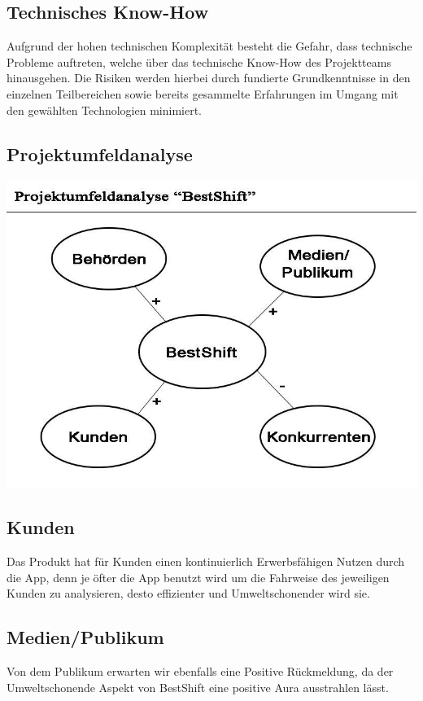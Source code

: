 \subsection{Technisches Know-How}
Aufgrund der hohen technischen Komplexität besteht die Gefahr, 
dass technische Probleme auftreten, welche über das technische Know-How des Projektteams 
hinausgehen. Die Risiken werden hierbei durch fundierte Grundkenntnisse in den einzelnen Teilbereichen sowie bereits gesammelte Erfahrungen im Umgang mit den gewählten Technologien minimiert. 


\subsection{Projektumfeldanalyse}
\includegraphics[scale=0.5]{images/Puma.jpg}

\subsection{Kunden}
Das Produkt hat für Kunden einen kontinuierlich Erwerbsfähigen Nutzen durch die App,
denn je öfter die App benutzt wird um die Fahrweise des jeweiligen Kunden zu analysieren,
desto effizienter und Umweltschonender wird sie. 

\subsection{Medien/Publikum}
Von dem Publikum erwarten wir ebenfalls eine Positive Rückmeldung,
da der Umweltschonende Aspekt von BestShift eine positive Aura ausstrahlen lässt.

